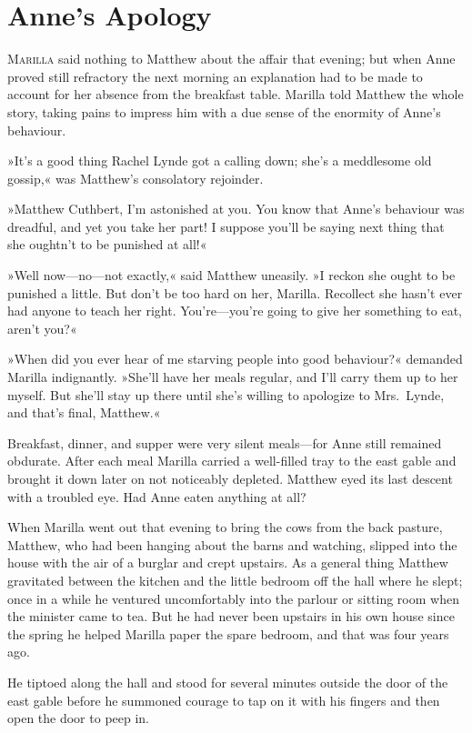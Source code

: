 \chapter{Anne's Apology}

\lettrine[lines=4]{M}{arilla} said nothing to Matthew about the affair that evening; but when Anne proved still refractory the next morning an explanation had to be made to account for her absence from the breakfast table. Marilla told Matthew the whole story, taking pains to impress him with a due sense of the enormity of Anne's behaviour.

»It's a good thing Rachel Lynde got a calling down; she's a meddlesome old gossip,« was Matthew's consolatory rejoinder.

»Matthew Cuthbert, I'm astonished at you. You know that Anne's behaviour was dreadful, and yet you take her part! I suppose you'll be saying next thing that she oughtn't to be punished at all!«

»Well now—no—not exactly,« said Matthew uneasily. »I reckon she ought to be punished a little. But don't be too hard on her, Marilla. Recollect she hasn't ever had anyone to teach her right. You're—you're going to give her something to eat, aren't you?«

»When did you ever hear of me starving people into good behaviour?« demanded Marilla indignantly. »She'll have her meals regular, and I'll carry them up to her myself. But she'll stay up there until she's willing to apologize to Mrs.~Lynde, and that's final, Matthew.«

Breakfast, dinner, and supper were very silent meals—for Anne still remained obdurate. After each meal Marilla carried a well-filled tray to the east gable and brought it down later on not noticeably depleted. Matthew eyed its last descent with a troubled eye. Had Anne eaten anything at all?

When Marilla went out that evening to bring the cows from the back pasture, Matthew, who had been hanging about the barns and watching, slipped into the house with the air of a burglar and crept upstairs. As a general thing Matthew gravitated between the kitchen and the little bedroom off the hall where he slept; once in a while he ventured uncomfortably into the parlour or sitting room when the minister came to tea. But he had never been upstairs in his own house since the spring he helped Marilla paper the spare bedroom, and that was four years ago.

He tiptoed along the hall and stood for several minutes outside the door of the east gable before he summoned courage to tap on it with his fingers and then open the door to peep in.

